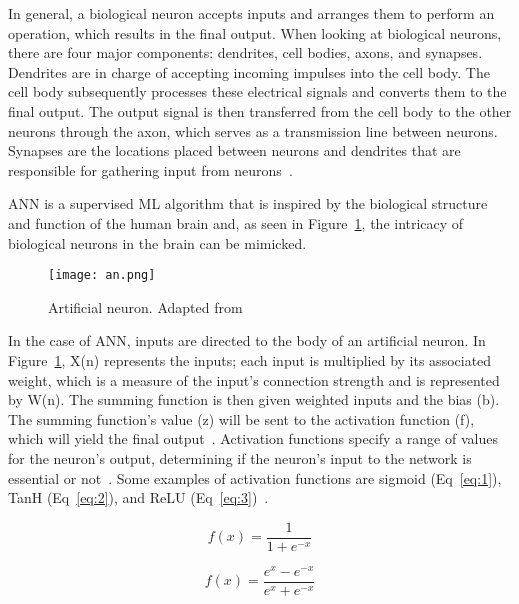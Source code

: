 In general, a biological neuron accepts inputs and arranges them to perform an operation, which results in the final output. When looking at biological neurons, there are four major components: dendrites, cell bodies, axons, and synapses. Dendrites are in charge of accepting incoming impulses into the cell body. The cell body subsequently processes these electrical signals and converts them to the final output. The output signal is then transferred from the cell body to the other neurons through the axon, which serves as a transmission line between neurons. Synapses are the locations placed between neurons and dendrites that are responsible for gathering input from neurons~\cite{Imran2019AClassification}. 

\gls{ANN} is a supervised \gls{ML} algorithm that is inspired by the biological structure and function of the human brain and, as seen in Figure~\ref{fig:an}, the intricacy of biological neurons in the brain can be mimicked.

\begin{figure}[htbp]
    \centering
    \texttt{[image: an.png]}
    \caption{Artificial neuron. Adapted from~\cite{Baheti12Choose}}
    \label{fig:an}
\end{figure}

In the case of \gls{ANN}, inputs are directed to the body of an artificial neuron. In Figure~\ref{fig:an}, X(n) represents the inputs; each input is multiplied by its associated weight, which is a measure of the input's connection strength and is represented by W(n). The summing function is then given weighted inputs and the bias (b). The summing function's value (z) will be sent to the activation function (f), which will yield the final output~\cite{Imran2019AClassification}. Activation functions specify a range of values for the neuron's output, determining if the neuron's input to the network is essential or not~\cite{2020ArtificialNetworks}. Some examples of activation functions are sigmoid (Eq~\ref{eq:1}), TanH (Eq~\ref{eq:2}), and ReLU (Eq~\ref{eq:3})~\cite{EnyinnaNwankpa2018ActivationLearning}.


\begin{equation}\label{eq:1}
    f(x) = \frac{1}{1+e^{-x}}
\end{equation}

\begin{equation}\label{eq:2}
    f(x) = \frac{e^{x}-e^{-x}}{e^{x}+e^{-x}}
\end{equation}

